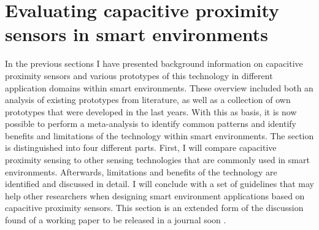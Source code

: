 \chapter{Evaluating capacitive proximity sensors in smart environments}
\label{ch:eval}
In the previous sections I have presented background information on capacitive proximity sensors and various prototypes of this technology in different application domains within smart environments. These overview included both an analysis of existing prototypes from literature, as well as a collection of own prototypes that were developed in the last years. With this as basis, it is now possible to perform a meta-analysis to identify common patterns and identify benefits and limitations of the technology within smart environments. The section is distinguished into four different parts. First, I will compare capacitive proximity sensing to other sensing technologies that are commonly used in smart environments. Afterwards, limitations and benefits of the technology are identified and discussed in detail. I will conclude with a set of guidelines that may help other researchers when designing smart environment applications based on capacitive proximity sensors. This section is an extended form of the discussion found of a working paper to be released in a journal soon  \cite{braun2014capjaise}.

\clearpage

\clearpage

\clearpage
